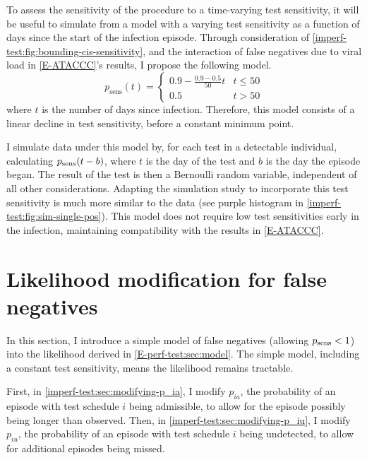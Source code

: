 \documentclass[thesis.tex]{subfiles}
\begin{document}
To assess the sensitivity of the procedure to a time-varying test sensitivity, it will be useful to simulate from a model with a varying test sensitivity as a function of days since the start of the infection episode.
Through consideration of \cref{imperf-test:fig:bounding-cis-sensitivity}, and the interaction of false negatives due to viral load in \cref{E-ATACCC}'s results, I propose the following model.
\begin{equation}
  p_\text{sens}(t) = \begin{cases}
    0.9 - \frac{0.9-0.5}{50}t &t \leq 50 \\
    0.5 &t > 50
  \end{cases}
  \label{imperf-test:eq:variable-test-sensitivity}
\end{equation}
where $t$ is the number of days since infection.
Therefore, this model consists of a linear decline in test sensitivity, before a constant minimum point.

I simulate data under this model by, for each test in a detectable individual, calculating $p_\text{sens}(t-b)$, where $t$ is the day of the test and $b$ is the day the episode began.
The result of the test is then a Bernoulli random variable, independent of all other considerations.
Adapting the simulation study to incorporate this test sensitivity is much more similar to the data (see purple histogram in \cref{imperf-test:fig:sim-single-pos}).
This model does not require low test sensitivities early in the infection, maintaining compatibility with the results in \cref{E-ATACCC}.

\section{Likelihood modification for false negatives} \label{imperf-test:sec:modelling}

In this section, I introduce a simple model of false negatives (\ie allowing $p_\text{sens} < 1$) into the likelihood derived in \cref{E-perf-test:sec:model}.
The simple model, including a constant test sensitivity, means the likelihood remains tractable.

First, in \cref{imperf-test:sec:modifying-p_ia}, I modify $p_{ia}$, the probability of an episode with test schedule $i$ being admissible, to allow for the episode possibly being longer than observed.
Then, in \cref{imperf-test:sec:modifying-p_iu}, I modify $p_{iu}$, the probability of an episode with test schedule $i$ being undetected, to allow for additional episodes being missed.
\end{document}

